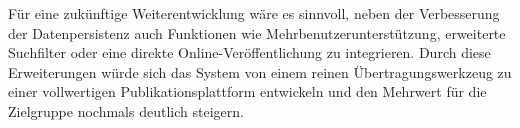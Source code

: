 Für eine zukünftige Weiterentwicklung wäre es sinnvoll, neben der Verbesserung der Datenpersistenz auch Funktionen 
wie Mehrbenutzerunterstützung, erweiterte Suchfilter oder eine direkte Online-Veröffentlichung zu integrieren. 
Durch diese Erweiterungen würde sich das System von einem reinen Übertragungswerkzeug zu einer vollwertigen 
Publikationsplattform entwickeln und den Mehrwert für die Zielgruppe nochmals deutlich steigern.